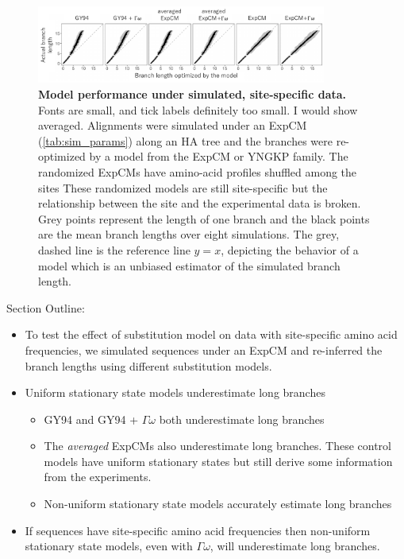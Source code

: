 \documentclass[11pt]{article}
\newcommand\skhcomment[1]{{\color{cyan}#1}}
\newcommand\jdbcomment[1]{{\color{red}#1}}
\begin{document}
\begin{figure}[H]
\centerline{\includegraphics[width=0.85\textwidth]{figures/simulations}}
\caption{\label{simulations}
\textbf{Model performance under simulated, site-specific data.} 
\jdbcomment{Fonts are small, and tick labels definitely too small. I would show averaged.}
Alignments were simulated under an ExpCM (\ref{tab:sim_params}) along an HA tree and the branches were re-optimized by a model from the ExpCM or YNGKP family. 
The randomized ExpCMs have amino-acid profiles shuffled among the sites 
These randomized models are still site-specific but the relationship between the site and the experimental data is broken. 
Grey points represent the length of one branch and the black points are the mean branch lengths over eight simulations. 
The grey, dashed line is the reference line $y=x$, depicting the behavior of a model which is an unbiased estimator of the simulated branch length. 
}
\end{figure}

\skhcomment{Section Outline:}

\begin{itemize}
\item To test the effect of substitution model on data with site-specific amino acid frequencies, we simulated sequences under an ExpCM and re-inferred the branch lengths using different substitution models.
\item Uniform stationary state models underestimate long branches
\begin{itemize}
\item GY94 and GY94 + $\Gamma\omega$ both underestimate long branches 
\item The \textit{averaged} ExpCMs also underestimate long branches. These control models have uniform stationary states but still derive some information from the experiments. 
\item Non-uniform stationary state models accurately estimate long branches
\end{itemize}
\item If sequences have site-specific amino acid frequencies then non-uniform stationary state models, even with $\Gamma\omega$, will underestimate long branches.
\end{itemize}
\end{document}
